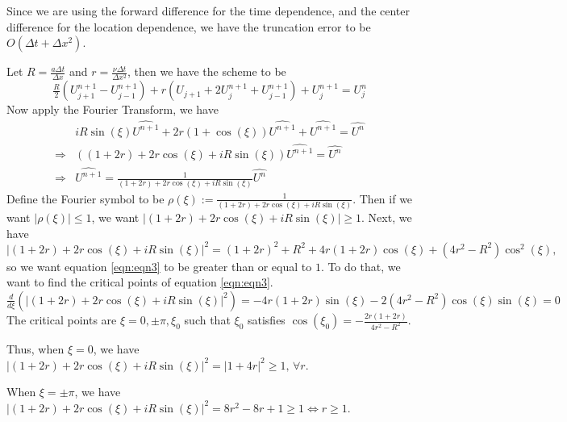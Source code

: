 \begin{answer}
    Since we are using the forward difference for the time dependence, and the center difference for the location dependence, we have the truncation error to be $O(\Delta t + \Delta x^2)$.
    
    Let $R = \tfrac{a \Delta t}{\Delta x}$ and $r = \tfrac{\nu \Delta t}{\Delta x^2}$, then we have the scheme to be
    \begin{equation}
        \tfrac{R}{2}(U_{j+1}^{n+1} - U_{j-1}^{n+1}) + r(U_{j+1}+2U_j^{n+1}+U_{j-1}^{n+1}) + U_{j}^{n+1} = U_{j}^n
    \end{equation}
    Now apply the Fourier Transform, we have
    \begin{equation}
        \begin{aligned}
            &iR\sin(\xi)\widehat{U^{n+1}} + 2r(1+\cos(\xi))\widehat{U^{n+1}}+ \widehat{U^{n+1}} = \widehat{U^{n}}\\
            \Rightarrow &((1+2r) + 2r\cos(\xi) + iR\sin(\xi))\widehat{U^{n+1}} = \widehat{U^{n}}\\
            \Rightarrow & \widehat{U^{n+1}} = \tfrac{1}{(1+2r) + 2r\cos(\xi) + iR\sin(\xi)}\widehat{U^{n}}
        \end{aligned}
    \end{equation}
    Define the Fourier symbol to be $\rho(\xi) := \tfrac{1}{(1+2r) + 2r\cos(\xi) + iR\sin(\xi)}$. Then if we want $\lvert \rho(\xi) \rvert \leq 1$, we want $\lvert (1+2r) + 2r\cos(\xi) + iR\sin(\xi)\rvert \geq 1$. Next, we have 
    \begin{equation}\label{eqn:eqn3}
        \lvert (1+2r) + 2r\cos(\xi) + iR\sin(\xi) \rvert^2 = (1+2r)^2 + R^2 + 4r(1+2r)\cos(\xi) + (4r^2-R^2)\cos^2(\xi),
    \end{equation}
    so we want equation \ref{eqn:eqn3} to be greater than or equal to $1$. To do that, we want to find the critical points of equation \ref{eqn:eqn3}.
    \begin{equation}
        \tfrac{d}{d\xi}(\lvert (1+2r) + 2r\cos(\xi) + iR\sin(\xi) \rvert^2) = -4r(1+2r)\sin(\xi)-2(4r^2-R^2)\cos(\xi)\sin(\xi) = 0
    \end{equation}
    The critical points are $\xi = 0,\pm \pi, \xi_0$ such that $\xi_0$ satisfies $\cos(\xi_0) = -\tfrac{2r(1+2r)}{4r^2-R^2}$.
    
    Thus, when $\xi = 0$, we have $\lvert (1+2r) + 2r\cos(\xi) + iR\sin(\xi)\rvert^2 = \lvert 1 + 4r \rvert^2 \geq 1,\, \forall r$.
    
    When $\xi = \pm \pi$, we have $\lvert (1+2r) + 2r\cos(\xi) + iR\sin(\xi)\rvert^2 = 8r^2-8r+1 \geq 1 \Leftrightarrow r \geq 1$.
    

\end{answer}
